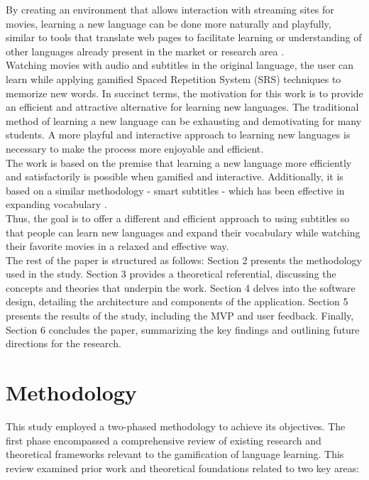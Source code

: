 \documentclass[12pt]{article}
\begin{document}
By creating an environment that allows interaction with streaming sites for movies, learning a new language can be done more naturally and playfully, similar to tools that translate web pages to facilitate learning or understanding of other languages already present in the market or research area \cite{ElBatanony21}. \\
Watching movies with audio and subtitles in the original language, the user can learn while applying gamified Spaced Repetition System (SRS) techniques to memorize new words. In succinct terms, the motivation for this work is to provide an efficient and attractive alternative for learning new languages.
The traditional method of learning a new language can be exhausting and demotivating for many students. A more playful and interactive approach to learning new languages is necessary to make the process more enjoyable and efficient. \\
The work is based on the premise that learning a new language more efficiently and satisfactorily is possible when gamified and interactive. Additionally, it is based on a similar methodology - smart subtitles - which has been effective in expanding vocabulary \cite{Kovacs14}. \\
Thus, the goal is to offer a different and efficient approach to using subtitles so that people can learn new languages and expand their vocabulary while watching their favorite movies in a relaxed and effective way.\\
The rest of the paper is structured as follows: Section 2 presents the methodology used in the study. Section 3 provides a theoretical referential, discussing the concepts and theories that underpin the work. Section 4 delves into the software design, detailing the architecture and components of the application. Section 5 presents the results of the study, including the MVP and user feedback. Finally, Section 6 concludes the paper, summarizing the key findings and outlining future directions for the research.



\section{Methodology}
This study employed a two-phased methodology to achieve its objectives. The first phase encompassed a comprehensive review of existing research and theoretical frameworks relevant to the gamification of language learning. This review examined prior work and theoretical foundations related to two key areas:
\end{document}
